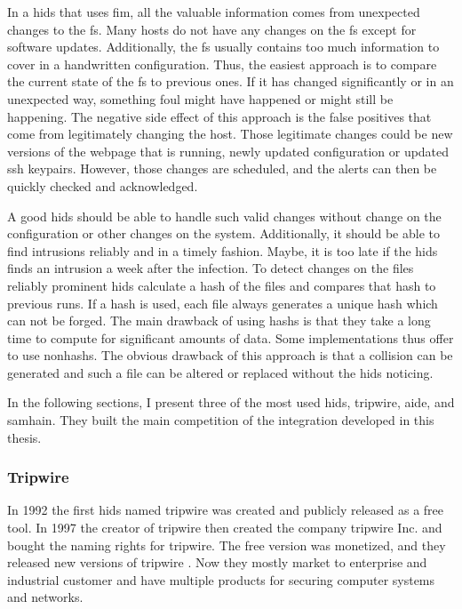 In a \gls{hids} that uses \gls{fim}, all the valuable information comes from unexpected changes to the \gls{fs}. Many hosts do not have any changes on the \gls{fs} except for software updates. Additionally, the \gls{fs} usually contains too much information to cover in a handwritten configuration. Thus, the easiest approach is to compare the current state of the \gls{fs} to previous ones. If it has changed significantly or in an unexpected way, something foul might have happened or might still be happening. The negative side effect of this approach is the false positives that come from legitimately changing the host. Those legitimate changes could be new versions of the webpage that is running, newly updated configuration or updated ssh keypairs. However, those changes are scheduled, and the alerts can then be quickly checked and acknowledged.

A good \gls{hids} should be able to handle such valid changes without change on the configuration or other changes on the system. Additionally, it should be able to find intrusions reliably and in a timely fashion. Maybe, it is too late if the \gls{hids} finds an intrusion a week after the infection. To detect changes on the files reliably prominent \gls{hids} calculate a hash of the files and compares that hash to previous runs. If a \gls{hash} is used, each file always generates a unique hash which can not be forged. The main drawback of using \glspl{hash} is that they take a long time to compute for significant amounts of data. Some implementations thus offer to use \glspl{nonhash}. The obvious drawback of this approach is that a collision can be generated and such a file can be altered or replaced without the \gls{hids} noticing.

In the following sections, I present three of the most used \gls{hids}, \Gls{tripwire}, \Gls{aide}, and \Gls{samhain}. They built the main competition of the integration developed in this thesis.

\subsubsection{Tripwire}
\label{sec:tripwire}

In 1992 the first \gls{hids} named \gls{tripwire} was created and publicly released as a free tool. In 1997 the creator of \gls{tripwire} then created the company \Gls{tripwire} Inc. and bought the naming rights for \gls{tripwire}. The free version was monetized, and they released new versions of \gls{tripwire} \cite{Tripwire:Impl, Tripwire:company}. Now they mostly market to enterprise and industrial customer and have multiple products for securing computer systems and networks. \cite{tripwire}

